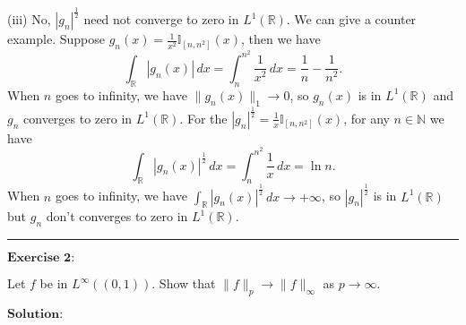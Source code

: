 \documentclass[12pt]{article}
\begin{document}
(iii) No, $|g_{n}|^{\frac{1}{2}}$ need not converge to zero in $L^{1}(\mathbb{R})$. We can give a counter example. Suppose $g_{n}(x) = \frac{1}{x^{2}} \mathbb{I}_{[n, n^{2}]} (x)$, then we have
\begin{equation*}
   \int_{\mathbb{R}}^{} |g_{n}(x)| \, d x  = \int_{n}^{n^{2}} \frac{1}{x^{2}} \, d x  = \frac{1}{n} - \frac{1}{n^{2}}.
\end{equation*}
When $n$ goes to infinity, we have $\|g_{n}(x) \|_{1} \to 0$, so $g_{n} (x)$ is in $L^{1}(\mathbb{R})$ and $g_{n}$ converges to zero in $L^{1}(\mathbb{R})$. For the $|g_{n}|^{\frac{1}{2}} = \frac{1}{x} \mathbb{I}_{[n, n^{2}]} (x)$, for any $n \in \mathbb{N}$ we have 
\begin{equation*}
   \int_{\mathbb{R}}^{} |g_{n}(x)|^{\frac{1}{2}} \, d x  = \int_{n}^{n^{2}} \frac{1}{x} \, d x  = \ln n.
\end{equation*}
When $n$ goes to infinity, we have $\int_{\mathbb{R}}^{} |g_{n}(x)|^{\frac{1}{2}} \, d x \to + \infty$, so $|g_{n}|^{\frac{1}{2}}$ is in $L^{1}(\mathbb{R})$ but $g_{n}$ don't converges to zero in $L^{1}(\mathbb{R})$.
 



\noindent\rule[0.25\baselineskip]{\textwidth}{0.5pt}

\vspace{8pt}
$\textbf{Exercise 2:}$

Let $f$ be in $L^{\infty} ((0, 1))$. Show that $\|f \|_{p} \rightarrow \|f \|_{\infty}$ as $p \rightarrow \infty$.

\vspace{8pt}
$\textbf{Solution:}$
\end{document}

